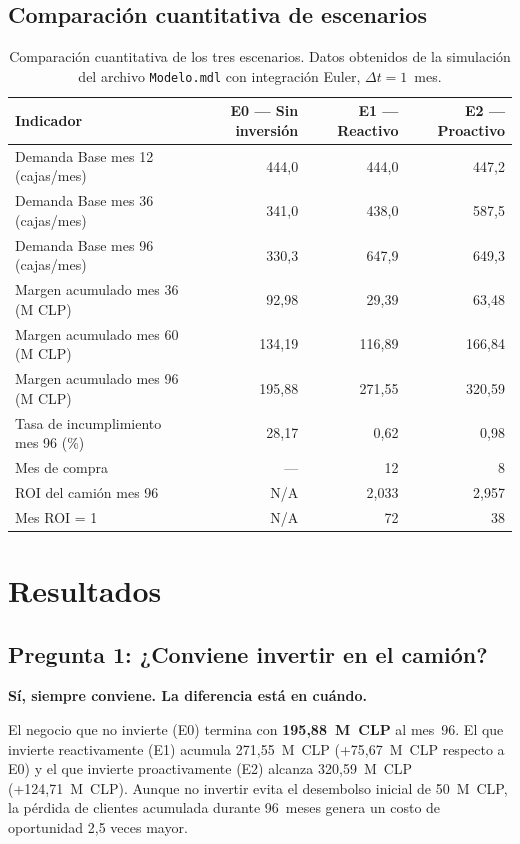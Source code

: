 \documentclass[10pt,a4paper]{article}
\begin{document}
\subsection{Comparación cuantitativa de escenarios}

\begin{table}[H]
\centering
\begin{tabular}{lrrr}
\toprule
Indicador & E0 --- Sin inversión & E1 --- Reactivo & E2 --- Proactivo \\
\midrule
Demanda Base mes 12 (cajas/mes) & 444,0 & 444,0 & 447,2 \\
Demanda Base mes 36 (cajas/mes) & 341,0 & 438,0 & 587,5 \\
Demanda Base mes 96 (cajas/mes) & 330,3 & 647,9 & 649,3 \\
\midrule
Margen acumulado mes 36 (M CLP) & 92,98 & 29,39 & 63,48 \\
Margen acumulado mes 60 (M CLP) & 134,19 & 116,89 & 166,84 \\
Margen acumulado mes 96 (M CLP) & 195,88 & 271,55 & 320,59 \\
\midrule
Tasa de incumplimiento mes 96 (\%) & 28,17 & 0,62 & 0,98 \\
Mes de compra & --- & 12 & 8 \\
ROI del camión mes 96 & N/A & 2,033 & 2,957 \\
Mes ROI = 1 & N/A & 72 & 38 \\
\bottomrule
\end{tabular}
\caption{Comparación cuantitativa de los tres escenarios. Datos obtenidos de la simulación del archivo \texttt{Modelo.mdl} con integración Euler, $\Delta t = 1$~mes.}
\end{table}

\newpage

\section{Resultados}

\subsection{Pregunta 1: ¿Conviene invertir en el camión?}

\textbf{Sí, siempre conviene. La diferencia está en cuándo.}

El negocio que no invierte (E0) termina con \textbf{195,88~M~CLP} al mes~96. El que invierte reactivamente (E1) acumula 271,55~M~CLP (+75,67~M~CLP respecto a E0) y el que invierte proactivamente (E2) alcanza 320,59~M~CLP (+124,71~M~CLP). Aunque no invertir evita el desembolso inicial de 50~M~CLP, la pérdida de clientes acumulada durante 96~meses genera un costo de oportunidad 2,5 veces mayor.
\end{document}
